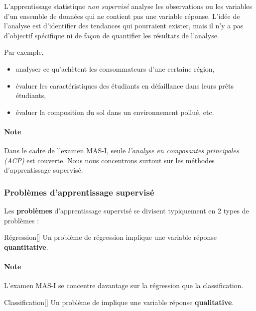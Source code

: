 \documentclass[french]{article}
\begin{document}
\begin{multicols*}{2}
\begin{definitionNOHFILLsub}
L'apprentissage statistique \textit{non supervisé} analyse les observations ou les variables d'un ensemble de données qui ne contient pas une variable réponse. L'idée de l'analyse est d'identifier des tendances qui pourraient exister, mais il n'y a pas d'objectif spécifique ni de façon de quantifier les résultats de l'analyse.

\bigskip

Par exemple,
\begin{itemize}
	\item	analyser ce qu'achètent les consommateurs d'une certaine région,
	\item	évaluer les caractéristiques des étudiants en défaillance dans leurs prêts étudiants,
	\item	évaluer la composition du sol dans un environnement pollué, etc.
\end{itemize}
\end{definitionNOHFILLsub}

\paragraph{Note}	Dans le cadre de l'examen MAS-I, seule \textit{\underline{\hyperref[subsubsec:PCA]{l'analyse en composantes principales}} (ACP)} est couverte. Nous nous concentrons surtout sur les méthodes d'apprentissage supervisé.



\subsubsection{Problèmes d'apprentissage supervisé}
Les \textbf{problèmes} d'apprentissage supervisé se divisent typiquement en 2 types de problèmes : 

\begin{definitionGENERAL}{Régression}[]
Un problème de régression implique une variable réponse \textbf{quantitative}. 

\paragraph{Note}	L'examen MAS-I se concentre davantage sur la régression que la classification. 
\end{definitionGENERAL}

\begin{definitionGENERAL}{Classification}[]
Un problème de \textit{\underline{}} implique une variable réponse \textbf{qualitative}. 
\end{definitionGENERAL}


\end{multicols*}
\end{document}
